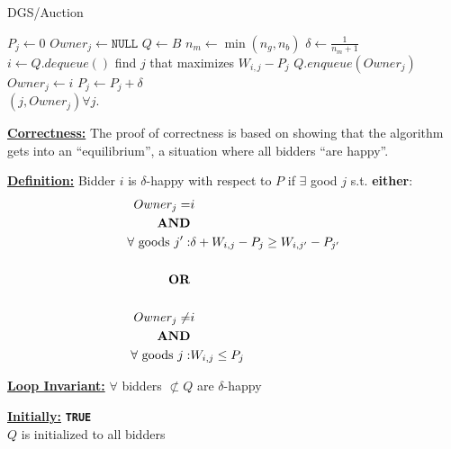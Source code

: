 \documentclass[twoside]{article}
\begin{document}
\begin{algorithm}
\caption{DGS/Auction}\label{euclid}
\begin{algorithmic}[1]
    \State $P_j \gets 0$ 
    \State $Owner_j \gets  \texttt{NULL}$ 
\EndFor
\State $Q \gets B$ 
\State $n_m \gets \min{(n_g, n_b)} $
\State $\delta \gets \frac{1}{n_m+1}$
\\
    \State $i \gets Q.dequeue()$
    \State find $j$ that maximizes $W_{i,j} - P_j$ 
     
        \State $Q.enqueue(Owner_j)$ 
        \State $Owner_j \gets i$ 
        \State $P_j \gets P_j + \delta$ 
    \EndIf
\EndWhile
\\
\Return $ (j, Owner_j) \forall{j} $. 
\end{algorithmic}
\end{algorithm}

\underline{\textbf{Correctness:}} The proof of correctness is based on showing that the algorithm gets into an “equilibrium”, a situation where all bidders ``are happy''.

\underline{\textbf{Definition:}} Bidder $i$ is $\delta$-happy with respect to $P$ if $\exists$ good $j$ s.t. \textbf{either}:
\begin{align*}
    Owner_j = &i\\
    \text{\textbf{AND}}\\
    \forall \text{ goods } j': &\delta + W_{i,j}-P_j \geq W_{i,j'}-P_{j'}\\\\
    \text{\textbf{OR}}\\\\
    Owner_j \neq &i\\
    \text{\textbf{AND}}\\
    \forall \text{ goods } j: &W_{i,j} \leq P_j
\end{align*}

\underline{\textbf{Loop Invariant:}} $\forall$ bidders $\not\subset Q$ are $\delta$-happy

\underline{\textbf{Initially:}} \texttt{\textbf{TRUE}}\\
$Q$ is initialized to all bidders
\end{document}
